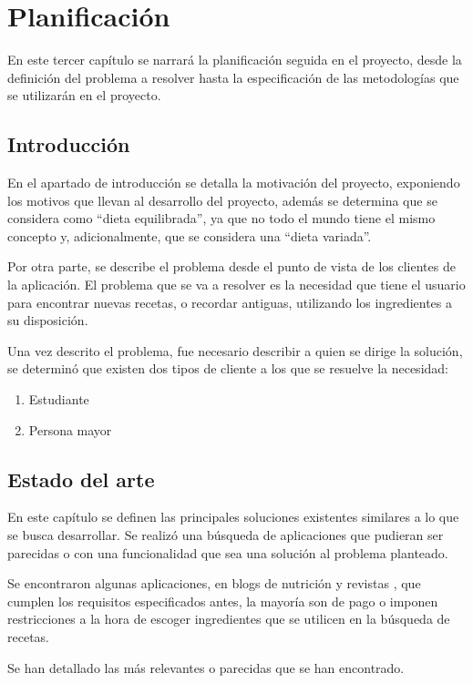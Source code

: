 \chapter{Planificación}
En este tercer capítulo se narrará la planificación seguida en el proyecto, desde la definición del problema a resolver hasta la especificación de las metodologías que se utilizarán en el proyecto. 

\section{Introducción}
En el apartado de introducción se detalla la motivación del proyecto, exponiendo los motivos que llevan al desarrollo del proyecto, además se determina que se considera como ``dieta equilibrada'', ya que no todo el mundo tiene el mismo concepto y, adicionalmente, que se considera una ``dieta variada''. 

Por otra parte, se describe el problema desde el punto de vista de los clientes de la aplicación. El problema que se va a resolver es la necesidad que tiene el usuario para encontrar nuevas recetas, o recordar antiguas, utilizando los ingredientes a su disposición. 

Una vez descrito el problema, fue necesario describir a quien se dirige la solución, se determinó que existen dos tipos de cliente a los que se resuelve la necesidad:
\begin{enumerate}
    \item Estudiante
    \item Persona mayor
\end{enumerate}

\section{Estado del arte}
En este capítulo se definen las principales soluciones existentes similares a lo que se busca desarrollar. Se realizó una búsqueda de aplicaciones que pudieran ser parecidas o con una funcionalidad que sea una solución al problema planteado. 

Se encontraron algunas aplicaciones, en blogs de nutrición y revistas \cite{Healthline2022}\cite{TheGuardian2016}\cite{BusinessInsider2021}, que cumplen los requisitos especificados antes, la mayoría son de pago o imponen restricciones a la hora de escoger ingredientes que se utilicen en la búsqueda de recetas. 

Se han detallado las más relevantes o parecidas que se han encontrado.

